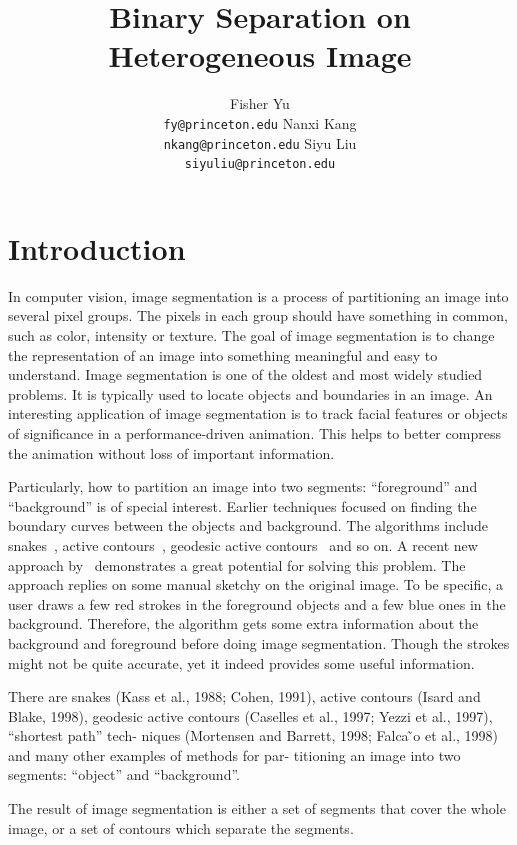 \documentclass{article} %
\title{Binary Separation on Heterogeneous Image}
\author{
Fisher Yu \\
\texttt{fy@princeton.edu}
\And
Nanxi Kang \\
\texttt{nkang@princeton.edu} 
\And
Siyu Liu\\
\texttt{siyuliu@princeton.edu}
}
\begin{document}
\maketitle

\section{Introduction}

In computer vision, image segmentation is a process of partitioning an image into several pixel groups. The pixels in each group should have something in common, such as color, intensity or texture. The goal of image segmentation is to change the representation of an image into something meaningful and easy to understand. Image segmentation is one of the oldest and most widely studied problems. It is typically used to locate objects and boundaries in an image. An interesting application of image segmentation is to track facial features or objects of significance in a performance-driven animation. This helps to better compress the animation without loss of important information.

Particularly, how to partition an image into two segments: ``foreground'' and ``background'' is of special interest. Earlier techniques focused on finding the boundary curves between the objects and background. The algorithms include snakes~\citep{Kass1988snakes}, active contours~\citep{Isard1998condensation}, geodesic active contours~\citep{Caselles1995geodesic} and so on. A recent new approach by~\citet{Boykov2006graph} demonstrates a great potential for solving this problem. The approach replies on some manual sketchy on the original image. To be specific, a user draws a few red strokes in the foreground objects and a few blue ones in the background. Therefore, the algorithm gets some extra information about the background and foreground before doing image segmentation. Though the strokes might not be quite accurate, yet it indeed provides some useful information.   





There are snakes (Kass et al., 1988; Cohen, 1991), active contours (Isard and Blake, 1998), geodesic active contours (Caselles et al., 1997; Yezzi et al., 1997), “shortest path” tech- niques (Mortensen and Barrett, 1998; Falca ̃o et al., 1998) and many other examples of methods for par- titioning an image into two segments: “object” and “background”. 

The result of image segmentation is either a set of segments that cover the whole image, or a set of contours which separate the segments.
\end{document}

